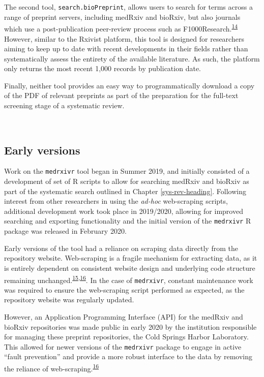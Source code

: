 \documentclass[a4paper, twoside]{templates/ociamthesis}
\begin{document}
The second tool, \texttt{search.bioPreprint}, allows users to search for terms across a range of preprint servers, including medRxiv and bioRxiv, but also journals which use a post-publication peer-review process such as F1000Research.\textsuperscript{\protect\hyperlink{ref-iwema2016}{14}} However, similar to the Rxivist platform, this tool is designed for researchers aiming to keep up to date with recent developments in their fields rather than systematically assess the entirety of the available literature. As such, the platform only returns the most recent 1,000 records by publication date.

Finally, neither tool provides an easy way to programmatically download a copy of the PDF of relevant preprints as part of the preparation for the full-text screening stage of a systematic review.

~

\hypertarget{early-versions}{%
\subsection{Early versions}\label{early-versions}}

Work on the \texttt{medrxivr} tool began in Summer 2019, and initially consisted of a development of set of R scripts to allow for searching medRxiv and bioRxiv as part of the systematic search outlined in Chapter \ref{sys-rev-heading}. Following interest from other researchers in using the \emph{ad-hoc} web-scraping scripts, additional development work took place in 2019/2020, allowing for improved searching and exporting functionality and the initial version of the \texttt{medrxivr} R package was released in February 2020.

Early versions of the tool had a reliance on scraping data directly from the repository website. Web-scraping is a fragile mechanism for extracting data, as it is entirely dependent on consistent website design and underlying code structure remaining unchanged.\textsuperscript{\protect\hyperlink{ref-shaw2002}{15},\protect\hyperlink{ref-laprie1992}{16}}. In the case of \texttt{medrxivr}, constant maintenance work was required to ensure the web-scraping script performed as expected, as the repository website was regularly updated.

However, an Application Programming Interface (API) for the medRxiv and bioRxiv repositories was made public in early 2020 by the institution responsible for managing these preprint repositories, the Cold Springs Harbor Laboratory. This allowed for newer versions of the \texttt{medrxivr} package to engage in active ``fault prevention'' and provide a more robust interface to the data by removing the reliance of web-scraping.\textsuperscript{\protect\hyperlink{ref-laprie1992}{16}}
\end{document}
